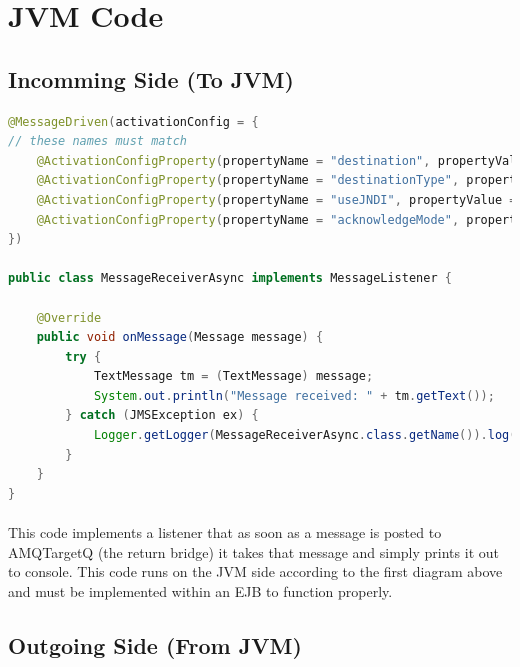 \documentclass[
10pt, %
letterpaper, %
oneside, %
headinclude,footinclude, %
BCOR5mm, %
]{scrartcl}
\begin{document}

\section{JVM Code}


\subsection {\textbf{Incomming Side (To JVM)}}

\begin{lstlisting}[language=Java]
@MessageDriven(activationConfig = {
// these names must match
    @ActivationConfigProperty(propertyName = "destination", propertyValue = "java:jboss/exported/jms/queue/AMQTargetQ"),
    @ActivationConfigProperty(propertyName = "destinationType", propertyValue = "javax.jms.Queue"),
    @ActivationConfigProperty(propertyName = "useJNDI", propertyValue = "true"),
    @ActivationConfigProperty(propertyName = "acknowledgeMode", propertyValue = "Auto-acknowledge")
})

public class MessageReceiverAsync implements MessageListener {

    @Override
    public void onMessage(Message message) {
        try {
            TextMessage tm = (TextMessage) message;
            System.out.println("Message received: " + tm.getText());
        } catch (JMSException ex) {
            Logger.getLogger(MessageReceiverAsync.class.getName()).log(Level.SEVERE, null, ex);
        }
    }
}
\end{lstlisting}

\paragraph{}
This code implements a listener that as soon as a message is posted to AMQTargetQ  (the return bridge) it takes that message and simply prints it out to console. This code runs on the JVM side according to the first diagram above and must be implemented within an EJB to function properly.


\subsection{\textbf{Outgoing Side (From JVM)}}
\end{document}
